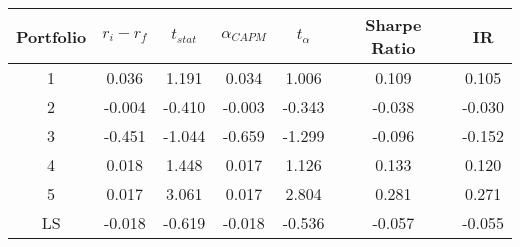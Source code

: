 \begin{tabular}{ccccccc}
\toprule
Portfolio & $r_i - r_f$ & $t_{stat}$ & $\alpha_{CAPM}$ & $t_{\alpha}$ & Sharpe Ratio & IR \\
\midrule
1 & 0.036 & 1.191 & 0.034 & 1.006 & 0.109 & 0.105 \\
2 & -0.004 & -0.410 & -0.003 & -0.343 & -0.038 & -0.030 \\
3 & -0.451 & -1.044 & -0.659 & -1.299 & -0.096 & -0.152 \\
4 & 0.018 & 1.448 & 0.017 & 1.126 & 0.133 & 0.120 \\
5 & 0.017 & 3.061 & 0.017 & 2.804 & 0.281 & 0.271 \\
LS & -0.018 & -0.619 & -0.018 & -0.536 & -0.057 & -0.055 \\
\bottomrule
\end{tabular}

